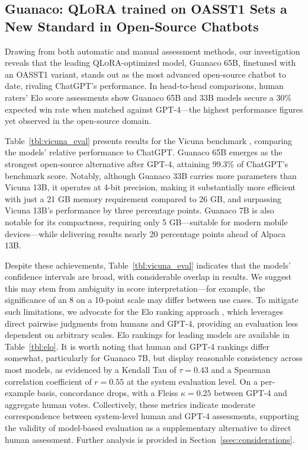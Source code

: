 \subsection{\textbf{Guanaco}: \textsc{QLoRA} trained on OASST1 Sets a New Standard in Open-Source Chatbots}

Drawing from both automatic and manual assessment methods, our investigation reveals that the leading \textsc{QLoRA}-optimized model, {Guanaco} 65B, finetuned with an OASST1 variant, stands out as the most advanced open-source chatbot to date, rivaling ChatGPT's performance. In head-to-head comparisons, human raters' Elo score assessments show {Guanaco} 65B and 33B models secure a 30\% expected win rate when matched against GPT-4—the highest performance figures yet observed in the open-source domain.

Table~\ref{tbl:vicuna_eval} presents results for the Vicuna benchmark \cite{vicuna2023}, comparing the models' relative performance to ChatGPT. {Guanaco} 65B emerges as the strongest open-source alternative after GPT-4, attaining 99.3\% of ChatGPT’s benchmark score. Notably, although {Guanaco} 33B carries more parameters than Vicuna 13B, it operates at 4-bit precision, making it substantially more efficient with just a 21 GB memory requirement compared to 26 GB, and surpassing Vicuna 13B’s performance by three percentage points. {Guanaco} 7B is also notable for its compactness, requiring only 5 GB—suitable for modern mobile devices—while delivering results nearly 20 percentage points ahead of Alpaca 13B.

Despite these achievements, Table~\ref{tbl:vicuna_eval} indicates that the models' confidence intervals are broad, with considerable overlap in results. We suggest this may stem from ambiguity in score interpretation—for example, the significance of an 8 on a 10-point scale may differ between use cases. To mitigate such limitations, we advocate for the Elo ranking approach \citep{elo1967proposed}, which leverages direct pairwise judgments from humans and GPT-4, providing an evaluation less dependent on arbitrary scales. Elo rankings for leading models are available in Table~\ref{tbl:elo}. It is worth noting that human and GPT-4 rankings differ somewhat, particularly for Guanaco 7B, but display reasonable consistency across most models, as evidenced by a Kendall Tau of $\tau=0.43$ and a Spearman correlation coefficient of $r=0.55$ at the system evaluation level. On a per-example basis, concordance drops, with a Fleiss $\kappa=0.25$ between GPT-4 and aggregate human votes. Collectively, these metrics indicate moderate correspondence between system-level human and GPT-4 assessments, supporting the validity of model-based evaluation as a supplementary alternative to direct human assessment. Further analysis is provided in Section~\ref{ssec:considerations}.

